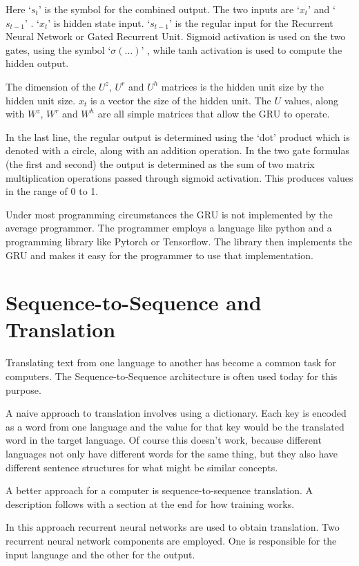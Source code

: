 Here `$ s_t $' is the symbol for the combined output. The two inputs are `$ x_t $' and `$ s_{t-1} $' . `$ x_t $' is hidden state input. `$ s_{t-1} $' is the regular input for the Recurrent Neural Network or Gated Recurrent Unit. Sigmoid activation is used on the two gates, using the symbol `$ \sigma(...) $' , while tanh activation is used to compute the hidden output. 

The dimension of the $U^z$, $U^r$ and $U^h$ matrices is the hidden unit size by the hidden unit size. $ x_t $ is a vector the size of the hidden unit. The $U$ values, along with $ W^z $, $ W^r $ and $ W^h $  are all simple matrices that allow the GRU to operate.

In the last line, the regular output is determined using the `dot' product which is denoted with a circle, along with an addition operation. In the two gate formulas (the first and second) the output is determined as the sum of two matrix multiplication operations passed through sigmoid activation. This produces values in the range of 0 to 1.

Under most programming circumstances the GRU is not implemented by the average programmer. The programmer employs a language like python and a programming library like Pytorch or Tensorflow. The library then implements the GRU and makes it easy for the programmer to use that implementation.

\section{Sequence-to-Sequence and Translation}

Translating text from one language to another has become a common task for computers. The Sequence-to-Sequence architecture is often used today for this purpose. %

A naive approach to translation involves using a dictionary. Each key is encoded as a word from one language and the value for that key would be the translated word in the target language. Of course this doesn't work, because different languages not only have different words for the same thing, but they also have different sentence structures for what might be similar concepts.

A better approach for a computer is sequence-to-sequence translation. A description follows with a section at the end for how training works.

In this approach recurrent neural networks are used to obtain translation. Two recurrent neural network components are employed. One is responsible for the input language and the other for the output. 


